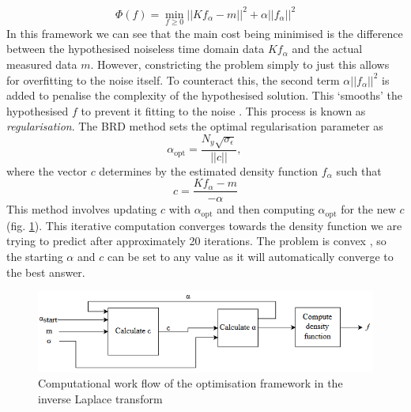 \begin{equation}
    \Phi(f) = \min_{f\geq0}  ||Kf_\alpha - m||^2 + \alpha||f_{\alpha}||^2
    \label{eq:minimseError1981Optimise}
\end{equation}    
In this framework we can see that the main cost being minimised is the difference between the hypothesised noiseless time domain data $Kf_\alpha$ and the actual measured data $m$. However, constricting the problem simply to just this allows for overfitting to the noise itself. To counteract this, the second term $\alpha||f_{\alpha}||^2$ is added to penalise the complexity of the hypothesised solution. This `smooths' the hypothesised $f$ to prevent it fitting to the noise \cite{RegularizationElden1977algorithms}. This process is known as \textit{regularisation}.
The BRD method \cite{BulterReedsDawsonMethod1981} sets the optimal regularisation parameter as
\begin{equation}
    \alpha_{\text{opt}} =  \frac{N_y \sqrt{ \sigma_{\epsilon} } }{||c||} 
    \text{, }
    \label{eq:optAlphaOptimise}
\end{equation} 
where the vector $c$ determines by the estimated density function $f_\alpha$ \cite{Venk2DFredholm2002} such that
\begin{equation}
    c =\frac {Kf_{\alpha} - m}{-\alpha}  
    \label{eq:optCOptimise}
\end{equation}  
    This method involves updating $c$ with $\alpha_{\text{opt}}$ and then computing $\alpha_{\text{opt}}$ for the new $c$ (fig. \ref{fig:2002Optimisation}). This iterative computation converges towards the density function we are trying to predict after approximately 20 iterations. The problem is convex \cite{BulterReedsDawsonMethod1981}, so the starting $\alpha$ and $c$ can be set to any value as it will automatically converge to the best answer. 

\begin{figure}[ht!]
    \centering
    \includegraphics[width=\textwidth]{BlockDiagram2002Optimisation.png}
    \caption{Computational work flow of the optimisation framework in the inverse Laplace transform}
    \label{fig:2002Optimisation}
\end{figure}

